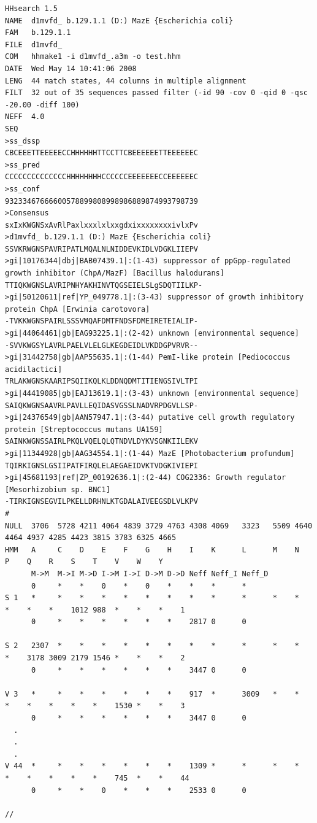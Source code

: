 \documentclass[11pt,a4paper]{article}
\begin{document}
\scriptsize
\begin{verbatim}
HHsearch 1.5
NAME  d1mvfd_ b.129.1.1 (D:) MazE {Escherichia coli}
FAM   b.129.1.1
FILE  d1mvfd_
COM   hhmake1 -i d1mvfd_.a3m -o test.hhm 
DATE  Wed May 14 10:41:06 2008
LENG  44 match states, 44 columns in multiple alignment
FILT  32 out of 35 sequences passed filter (-id 90 -cov 0 -qid 0 -qsc -20.00 -diff 100)
NEFF  4.0 
SEQ
>ss_dssp
CBCEEETTEEEEECCHHHHHHTTCCTTCBEEEEEETTEEEEEEC
>ss_pred
CCCCCCCCCCCCCCHHHHHHHHCCCCCCEEEEEEECCEEEEEEC
>ss_conf
93233467666600578899808998986889874993798739
>Consensus
sxIxKWGNSxAvRlPaxlxxxlxlxxgdxixxxxxxxxivlxPv
>d1mvfd_ b.129.1.1 (D:) MazE {Escherichia coli}
SSVKRWGNSPAVRIPATLMQALNLNIDDEVKIDLVDGKLIIEPV
>gi|10176344|dbj|BAB07439.1|:(1-43) suppressor of ppGpp-regulated growth inhibitor (ChpA/MazF) [Bacillus halodurans]
TTIQKWGNSLAVRIPNHYAKHINVTQGSEIELSLgSDQTIILKP-
>gi|50120611|ref|YP_049778.1|:(3-43) suppressor of growth inhibitory protein ChpA [Erwinia carotovora]
-TVKKWGNSPAIRLSSSVMQAFDMTFNDSFDMEIRETEIALIP-
>gi|44064461|gb|EAG93225.1|:(2-42) unknown [environmental sequence]
-SVVKWGSYLAVRLPAELVLELGLKEGDEIDLVKDDGPVRVR--
>gi|31442758|gb|AAP55635.1|:(1-44) PemI-like protein [Pediococcus acidilactici]
TRLAKWGNSKAARIPSQIIKQLKLDDNQDMTITIENGSIVLTPI
>gi|44419085|gb|EAJ13619.1|:(3-43) unknown [environmental sequence]
SAIQKWGNSAAVRLPAVLLEQIDASVGSSLNADVRPDGVLLSP-
>gi|24376549|gb|AAN57947.1|:(3-44) putative cell growth regulatory protein [Streptococcus mutans UA159]
SAINKWGNSSAIRLPKQLVQELQLQTNDVLDYKVSGNKIILEKV
>gi|11344928|gb|AAG34554.1|:(1-44) MazE [Photobacterium profundum]
TQIRKIGNSLGSIIPATFIRQLELAEGAEIDVKTVDGKIVIEPI
>gi|45681193|ref|ZP_00192636.1|:(2-44) COG2336: Growth regulator [Mesorhizobium sp. BNC1]
-TIRKIGNSEGVILPKELLDRHNLKTGDALAIVEEGSDLVLKPV
#
NULL  3706  5728 4211 4064 4839 3729 4763 4308 4069   3323   5509 4640 4464 4937 4285 4423 3815 3783 6325 4665
HMM   A     C    D    E    F    G    H    I    K      L      M    N    P    Q    R    S    T    V    W    Y
      M->M  M->I M->D I->M I->I D->M D->D Neff Neff_I Neff_D
      0     *    *    0    *    0    *    *    *      *
S 1   *     *    *    *    *    *    *    *    *      *      *    *    *    *    *    1012 988  *    *    *    1
      0     *    *    *    *    *    *    2817 0      0

S 2   2307  *    *    *    *    *    *    *    *      *      *    *    *    3178 3009 2179 1546 *    *    *    2
      0     *    *    *    *    *    *    3447 0      0

V 3   *     *    *    *    *    *    *    917  *      3009   *    *    *    *    *    *    *    1530 *    *    3
      0     *    *    *    *    *    *    3447 0      0
  .
  .
  .
V 44  *     *    *    *    *    *    *    1309 *      *      *    *    *    *    *    *    *    745  *    *    44
      0     *    *    0    *    *    *    2533 0      0

//
\end{verbatim}
\normalsize
\end{document}
